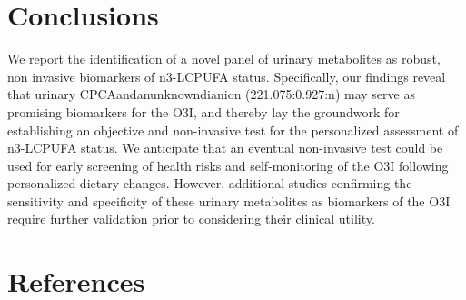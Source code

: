 \documentclass[journal=jacsat,manuscript=article]{achemso}
\begin{document}
\section{Conclusions}\label{conclusions}

We report the identification of a novel panel of urinary metabolites as
robust, non invasive biomarkers of n3-LCPUFA status. Specifically, our
findings reveal that urinary CPCAandanunknowndianion (221.075:0.927:n)
may serve as promising biomarkers for the O3I, and thereby lay the
groundwork for establishing an objective and non-invasive test for the
personalized assessment of n3-LCPUFA status. We anticipate that an
eventual non-invasive test could be used for early screening of health
risks and self-monitoring of the O3I following personalized dietary
changes. However, additional studies confirming the sensitivity and
specificity of these urinary metabolites as biomarkers of the O3I
require further validation prior to considering their clinical utility.

\section{References}\label{references}
\end{document}

